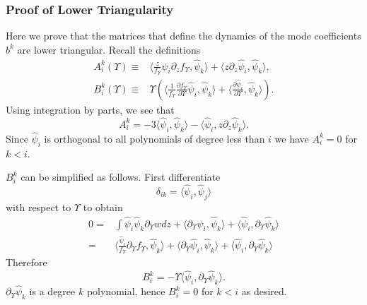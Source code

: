 \subsubsection{Proof of Lower Triangularity}\label{lower_triang}
Here we prove that the matrices that define the dynamics of the mode coefficients $b^k$ are lower triangular.  Recall the definitions
\begin{align}
A^k_i(\Upsilon)\equiv&\langle\frac{z}{f_\Upsilon }\hat\psi_i\partial_zf_\Upsilon ,\hat\psi_k\rangle+\langle z\partial_z \hat\psi_i,\hat\psi_k\rangle,\\
B^k_i(\Upsilon)\equiv &\Upsilon\left(\langle\frac{1}{f_\Upsilon }\frac{\partial f_\Upsilon }{\partial\Upsilon}\hat\psi_i,\hat\psi_k\rangle+\langle\frac{\partial\hat{\psi}_i}{\partial \Upsilon},\hat\psi_k\rangle\right).
\end{align}
Using integration by parts, we see that
\begin{equation}
A^k_i=-3\langle\hat\psi_i,\hat\psi_k\rangle-\langle \hat \psi_i,z\partial_z\hat\psi_k\rangle.
\end{equation}
Since $\hat\psi_i$ is orthogonal to all polynomials of degree less than $i$ we have $A^k_i=0$ for  $k<i$.  

$B^k_i$ can be simplified as follows.  First differentiate 
\begin{equation}
\delta_{ik}=\langle \hat\psi_i,\hat\psi_j\rangle
\end{equation}
with respect to $\Upsilon$ to obtain
\begin{align}
0=&\int \hat\psi_i\hat\psi_k\partial_{\Upsilon}wdz+\langle \partial_{\Upsilon}\hat\psi_i,\hat\psi_k\rangle+\langle \hat\psi_i,\partial_{\Upsilon}\hat\psi_k\rangle\\
=&\langle\frac{\hat\psi_i}{f_\Upsilon}\partial_{\Upsilon}f_\Upsilon,\hat\psi_k \rangle+\langle\partial_{\Upsilon}\hat\psi_i,\hat\psi_k\rangle+\langle \hat\psi_i,\partial_{\Upsilon}\hat\psi_k\rangle
\end{align}
Therefore 
\begin{equation}
B^k_i=-\Upsilon\langle\hat\psi_i,\partial_{\Upsilon}\hat\psi_k\rangle.
\end{equation}
$\partial_\Upsilon \hat\psi_k$ is a degree $k$ polynomial, hence $B_i^k=0$ for $k<i$ as desired.


